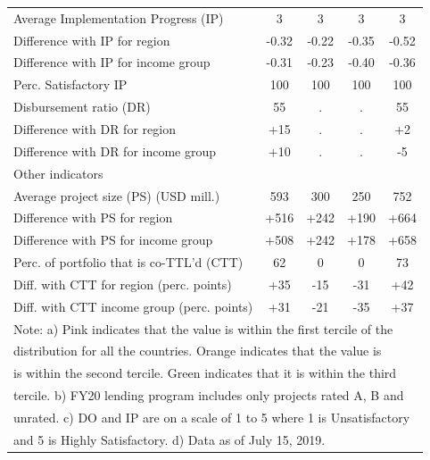 \documentclass[9.2pt,twocolumn]{article}
\begin{document}
\begin{table}[H]
\begin{tabular}{lcccc}
Average Implementation Progress (IP) & \cellcolor{blush} 3 & \cellcolor{blush} 3 & \cellcolor{blush} 3 & \cellcolor{blush} 3 \\ 
Difference with IP for region & -0.32 & -0.22 & -0.35 & -0.52 \\ 
Difference with IP for income group & -0.31 & -0.23 & -0.40 & -0.36 \\ 
Perc. Satisfactory IP & 100 & 100 & 100 & 100 \\ 
Disbursement ratio (DR) & \cellcolor{asparagus} 55 & . & . & \cellcolor{asparagus} 55 \\ 
Difference with DR for region & +15 & . & . & +2 \\ 
Difference with DR for income group & +10 & . & . & -5 \\ \hline
\cellcolor{iceberg}Other indicators & \cellcolor{iceberg} & \cellcolor{iceberg} & \cellcolor{iceberg} & \cellcolor{iceberg} \\ \hline
Average project size (PS) (USD mill.) & \cellcolor{asparagus} 593 & \cellcolor{asparagus} 300 & \cellcolor{asparagus} 250 & \cellcolor{asparagus} 752 \\ 
Difference with PS for region & +516 & +242 & +190 & +664 \\ 
Difference with PS for income group & +508 & +242 & +178 & +658 \\ 
Perc. of portfolio that is co-TTL'd (CTT) & \cellcolor{asparagus} 62 & \cellcolor{blush} 0 & \cellcolor{blush} 0 & \cellcolor{asparagus} 73 \\ 
Diff. with CTT for region (perc. points) & +35 & -15 & -31 & +42 \\ 
Diff. with CTT income group (perc. points) & +31 & -21 & -35 & +37 \\ \hline
 \multicolumn{5}{l}{Note: a) \colorbox{blush}{Pink} indicates that the value is within the first tercile of the} \\
 \multicolumn{5}{l}{distribution for all the countries. \colorbox{arylideyellow}{Orange} indicates that the value is } \\
 \multicolumn{5}{l}{is within the second tercile. \colorbox{asparagus}{Green} indicates that it is within the third} \\
 \multicolumn{5}{l}{tercile. b) FY20 lending program includes only projects rated A, B and } \\
 \multicolumn{5}{l}{unrated. c) DO and IP are on a scale of 1 to 5 where 1 is Unsatisfactory } \\
 \multicolumn{5}{l}{and 5 is Highly Satisfactory. d) Data as of July 15, 2019.} \\
\end{tabular}
\end{table}
\end{document}
